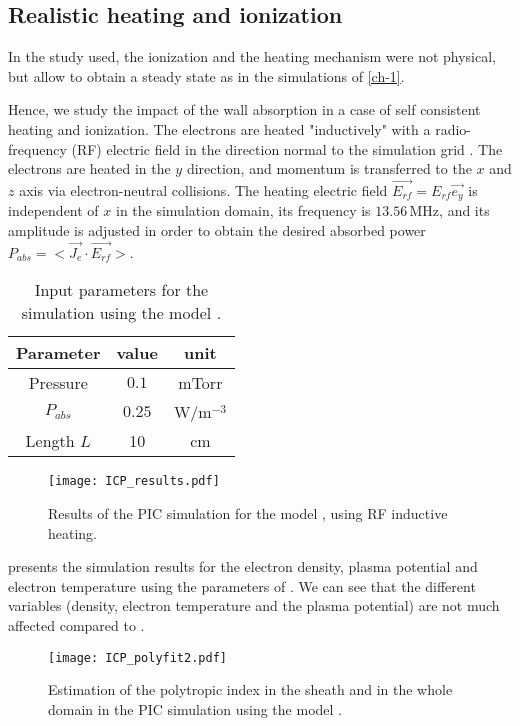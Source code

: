 \subsection{Realistic heating and ionization}
In the study used, the ionization and the heating mechanism were not physical, but allow to obtain a steady state as in the simulations of \cref{ch-1}.

Hence, we study the impact of the wall absorption in a case of self consistent heating and ionization.
The electrons are heated "inductively" with a radio-frequency (RF) electric field in the direction normal to the simulation grid \cite{meige2006a, lucken2018, turner1993}.
The electrons are heated in the $y$ direction, and momentum is transferred to the $x$ and $z$ axis via electron-neutral collisions.
The heating electric field $\vec{E_{rf}} = E_{rf} \vec{e_y}$ is independent of $x$ in the simulation domain, its frequency is $13.56$\,MHz, and its amplitude is adjusted in order to obtain the desired absorbed power $P_{abs} = < \vec{J_e} \cdot  \vec{E_{rf}}>$.


\begin{table}[!htbp]
  \centering
  \begin{tabular}{c | c | c}
    Parameter & value & unit \\ \hline
    Pressure & $0.1$ & mTorr\\
    $P_{abs}$ & $0.25$ & W/m$^{-3}$\\
    Length $L$&10&cm\\
  \end{tabular}
  \caption{Input parameters for the simulation using the model .}
  \label{tab-PIC2}
\end{table}

\begin{figure}[!htbp]
  \center
  \texttt{[image: ICP\_results.pdf]}
  \caption{Results of the PIC simulation for the model , using RF inductive heating.}
  \label{fig-icpresults}
\end{figure}

 presents the simulation results for the electron density, plasma potential and electron temperature using the parameters of .
We can see that the different variables (density, electron temperature and the plasma potential) are not much affected compared to .

\begin{figure}[!htbp]
  \centering
  \texttt{[image: ICP\_polyfit2.pdf]}
  \caption{Estimation of the polytropic index in the sheath and in the whole domain in the PIC simulation using the model .}
  \label{fig-icpfit}
\end{figure}

